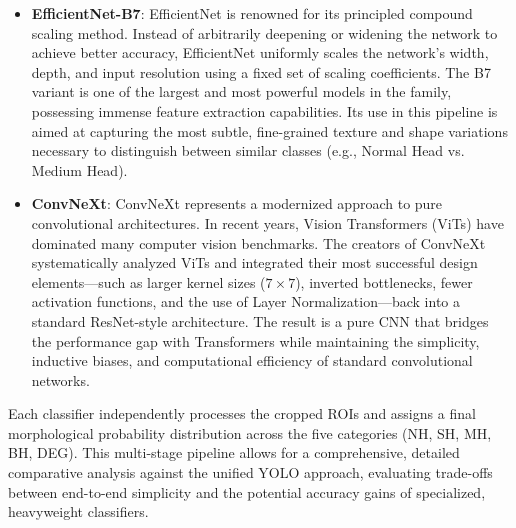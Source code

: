 \begin{itemize}
    \item \textbf{EfficientNet-B7}: EfficientNet is renowned for its principled compound scaling method. Instead of arbitrarily deepening or widening the network to achieve better accuracy, EfficientNet uniformly scales the network's width, depth, and input resolution using a fixed set of scaling coefficients. The B7 variant is one of the largest and most powerful models in the family, possessing immense feature extraction capabilities. Its use in this pipeline is aimed at capturing the most subtle, fine-grained texture and shape variations necessary to distinguish between similar classes (e.g., Normal Head vs. Medium Head).
    
    \item \textbf{ConvNeXt}: ConvNeXt represents a modernized approach to pure convolutional architectures. In recent years, Vision Transformers (ViTs) have dominated many computer vision benchmarks. The creators of ConvNeXt systematically analyzed ViTs and integrated their most successful design elements—such as larger kernel sizes ($7 \times 7$), inverted bottlenecks, fewer activation functions, and the use of Layer Normalization—back into a standard ResNet-style architecture. The result is a pure CNN that bridges the performance gap with Transformers while maintaining the simplicity, inductive biases, and computational efficiency of standard convolutional networks.
\end{itemize}

Each classifier independently processes the cropped ROIs and assigns a final morphological probability distribution across the five categories (NH, SH, MH, BH, DEG). This multi-stage pipeline allows for a comprehensive, detailed comparative analysis against the unified YOLO approach, evaluating trade-offs between end-to-end simplicity and the potential accuracy gains of specialized, heavyweight classifiers.
